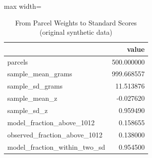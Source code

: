 \begin{table}[htbp]
\centering
\caption{From Parcel Weights to Standard Scores (original synthetic data)}
\begingroup
\small
\setlength{\tabcolsep}{6pt}
\renewcommand{\arraystretch}{1.12}
\begin{adjustbox}{max width=\linewidth}
\begin{tabular}{@{}lr@{}}
\toprule
 & value \\
\midrule
parcels & 500.000000 \\
sample\_mean\_grams & 999.668557 \\
sample\_sd\_grams & 11.513876 \\
sample\_mean\_z & -0.027620 \\
sample\_sd\_z & 0.959490 \\
model\_fraction\_above\_1012 & 0.158655 \\
observed\_fraction\_above\_1012 & 0.138000 \\
model\_fraction\_within\_two\_sd & 0.954500 \\
\bottomrule
\end{tabular}
\end{adjustbox}
\endgroup
\end{table}